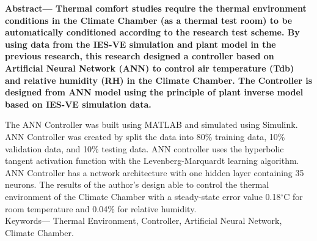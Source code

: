 \documentclass[a4paper,10pt]{article}
\begin{document}
	\vspace{0.3cm}
	
	{\setlength{\parindent}{0cm}\bfseries
		Abstract--- Thermal comfort studies require the thermal environment conditions in the Climate Chamber (as a thermal test room) to be automatically conditioned according to the research test scheme. By using data from the IES-VE simulation\cite{skripsiIchfan} and plant model\cite{skripsiTanto} in the previous research, this research designed a controller based on Artificial Neural Network (ANN) to control air temperature (Tdb) and relative humidity (RH) in the Climate Chamber. The Controller is designed from ANN model using the principle of plant inverse model based on IES-VE simulation data.
		
		The ANN Controller was built using MATLAB and simulated using Simulink. ANN Controller was created by split the data into 80\% training data, 10\% validation data, and 10\% testing data. ANN controller uses the hyperbolic tangent activation function with the Levenberg-Marquardt learning algorithm. ANN Controller has a network architecture with one hidden layer containing 35 neurons. The results of the author's design able to control the thermal environment of the Climate Chamber with a steady-state error value 0.18$^\circ$C for room temperature and 0.04\% for relative humidity.\\
		
		Keywords--- Thermal Environment, Controller, Artificial Neural Network, Climate Chamber.
	}
	
\end{document}
